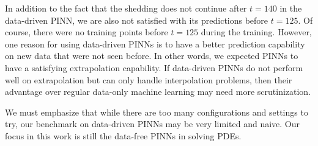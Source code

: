 In addition to the fact that the shedding does not continue after $t=140$ in the data-driven PINN, we are also not satisfied with its predictions before $t=125$.
Of course, there were no training points before $t=125$ during the training.
However, one reason for using data-driven PINNs is to have a better prediction capability on new data that were not seen before.
In other words, we expected PINNs to have a satisfying extrapolation capability.
If data-driven PINNs do not perform well on extrapolation but can only handle interpolation problems, then their advantage over regular data-only machine learning may need more scrutinization.

We must emphasize that while there are too many configurations and settings to try, our benchmark on data-driven PINNs may be very limited and naive.
Our focus in this work is still the data-free PINNs in solving PDEs.
